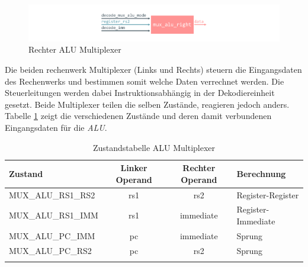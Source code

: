             \begin{figure}[H]
                \centering
                \includegraphics[scale=1]{img/block_mux_alu_right.pdf}
                \caption{Rechter ALU Multiplexer}
                \label{fig:alu}
            \end{figure}

            Die beiden rechenwerk Multiplexer (Links und Rechts) steuern die Eingangsdaten des Rechenwerks und bestimmen somit welche Daten
            verrechnet werden. Die Steuerleitungen werden dabei Instruktionsabhängig in der Dekodiereinheit gesetzt.
            Beide Multiplexer teilen die selben Zustände, reagieren jedoch anders.
            Tabelle \ref{tab:alu-mux} zeigt die verschiedenen Zustände und deren damit verbundenen Eingangsdaten für die \textit{ALU}.


            \begin{center}
                \begin{longtable}{| l | c | c | l |}
                    \hline
                        Zustand & Linker Operand & Rechter Operand & Berechnung \\
                    \hline
                        MUX\_ALU\_RS1\_RS2 & rs1 & rs2 & Register-Register \\
                    \hline
                        MUX\_ALU\_RS1\_IMM & rs1 & immediate &  Register-Immediate\\
                    \hline
                        MUX\_ALU\_PC\_IMM & pc & immediate & Sprung \\
                    \hline
                        MUX\_ALU\_PC\_RS2 & pc & rs2 & Sprung \\
                    \hline
                    \caption[Zustandstabelle ALU Multiplexer]{Zustandstabelle ALU Multiplexer}
                    \label{tab:alu-mux}
                \end{longtable}
            \end{center}

            
            

